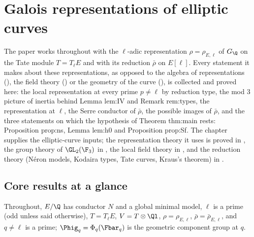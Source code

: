 \chapter{Galois representations of elliptic curves}\label{ch:galrep}

The paper works throughout with the $\ell$-adic representation $\rho=\rho_{E,\ell}$ of $G_\Q$ on the Tate module $T=T_\ell E$ and
with its reduction $\bar\rho$ on $E[\ell]$. Every statement it makes about these representations, as opposed to the algebra of
representations (), the field theory () or the geometry of the curve
(), is collected and proved here: the local representation at every prime $p\ne\ell$ by reduction
type, the mod $3$ picture of inertia behind Lemma lem:IV and Remark rem:types, the representation at $\ell$, the Serre conductor
of $\bar\rho$, the possible images of $\bar\rho$, and the three statements on which the hypothesis of Theorem thm:main rests:
Proposition prop:ns, Lemma lem:h0 and Proposition prop:Sf. The chapter supplies the elliptic-curve inputs; the representation
theory it uses is proved in , the group theory of $\GL_2(\F_3)$ in , the local field theory in
, and the reduction theory (N\'eron models, Kodaira types, Tate curves, Kraus's theorem) in .

\section*{Core results at a glance}

Throughout, $E/\Q$ has conductor $N$ and a global minimal model, $\ell$ is a prime (odd unless said otherwise), $T=T_\ell E$,
$V=T\otimes\Ql$, $\rho=\rho_{E,\ell}$, $\bar\rho=\bar\rho_{E,\ell}$, and $q\ne\ell$ is a prime; $\Phig_q=\Phi_q(\Fbar_q)$ is the geometric
component group at $q$.

